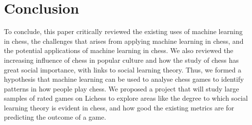 \documentclass[%
 superscriptaddress,
showpacs,preprintnumbers,
 amsmath,
 amssymb,
 aps,
 pra,
showkeys,
onecolumn,
notitlepage,
11pt,
tightenlines      %
]{revtex4-1}
\begin{document}
\section{Conclusion}
To conclude, this paper critically reviewed the existing uses of machine learning in chess, the challenges that arises from applying machine learning in chess, and the potential applications of machine learning in chess. We also reviewed the increasing influence of chess in popular culture and how the study of chess has great social importance, with links to social learning theory. Thus, we formed a hypothesis that machine learning can be used to analyse chess games to identify patterns in how people play chess. We proposed a project that will study large samples of rated games on Lichess to explore areas like the degree to which social learning theory is evident in chess, and how good the existing metrics are for predicting the outcome of a game.  



\end{document}
